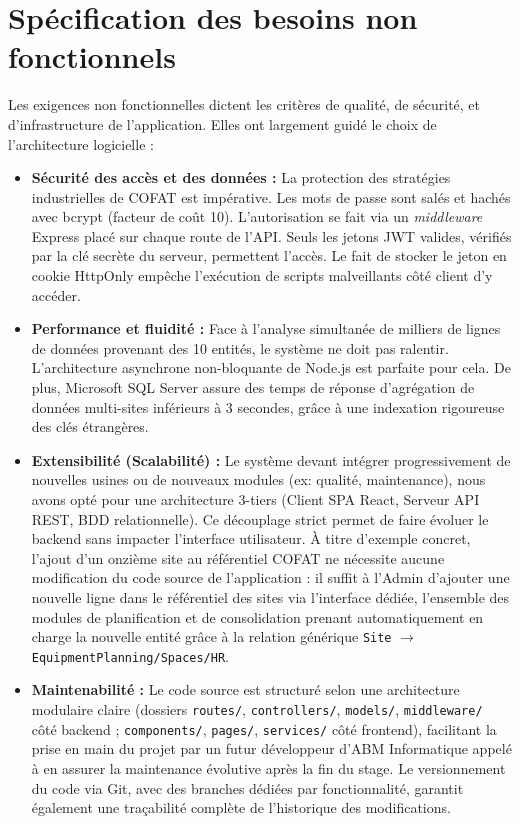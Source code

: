 \section{Spécification des besoins non fonctionnels}
Les exigences non fonctionnelles dictent les critères de qualité, de sécurité, et d'infrastructure de l'application. Elles ont largement guidé le choix de l'architecture logicielle :

\begin{itemize}
    \item \textbf{Sécurité des accès et des données :} La protection des stratégies industrielles de COFAT est impérative. Les mots de passe sont salés et hachés avec bcrypt (facteur de coût 10). L'autorisation se fait via un \textit{middleware} Express placé sur chaque route de l'API. Seuls les jetons JWT valides, vérifiés par la clé secrète du serveur, permettent l'accès. Le fait de stocker le jeton en cookie HttpOnly empêche l'exécution de scripts malveillants côté client d'y accéder.
    
    \item \textbf{Performance et fluidité :} Face à l'analyse simultanée de milliers de lignes de données provenant des 10 entités, le système ne doit pas ralentir. L'architecture asynchrone non-bloquante de Node.js est parfaite pour cela. De plus, Microsoft SQL Server assure des temps de réponse d'agrégation de données multi-sites inférieurs à 3 secondes, grâce à une indexation rigoureuse des clés étrangères.
    
    \item \textbf{Extensibilité (Scalabilité) :} Le système devant intégrer progressivement de nouvelles usines ou de nouveaux modules (ex: qualité, maintenance), nous avons opté pour une architecture 3-tiers (Client SPA React, Serveur API REST, BDD relationnelle). Ce découplage strict permet de faire évoluer le backend sans impacter l'interface utilisateur. À titre d'exemple concret, l'ajout d'un onzième site au référentiel COFAT ne nécessite aucune modification du code source de l'application : il suffit à l'Admin d'ajouter une nouvelle ligne dans le référentiel des sites via l'interface dédiée, l'ensemble des modules de planification et de consolidation prenant automatiquement en charge la nouvelle entité grâce à la relation générique \texttt{Site} $\rightarrow$ \texttt{EquipmentPlanning/Spaces/HR}.
    
    \item \textbf{Maintenabilité :} Le code source est structuré selon une architecture modulaire claire (dossiers \texttt{routes/}, \texttt{controllers/}, \texttt{models/}, \texttt{middleware/} côté backend ; \texttt{components/}, \texttt{pages/}, \texttt{services/} côté frontend), facilitant la prise en main du projet par un futur développeur d'ABM Informatique appelé à en assurer la maintenance évolutive après la fin du stage. Le versionnement du code via Git, avec des branches dédiées par fonctionnalité, garantit également une traçabilité complète de l'historique des modifications.
    

\end{itemize}
